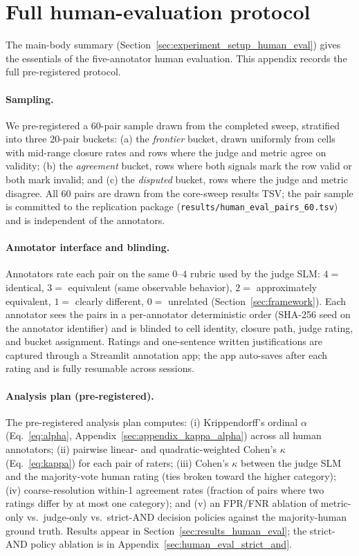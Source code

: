 \section{Full human-evaluation protocol}
\label{sec:appendix_human_eval_protocol}

The main-body summary (Section~\ref{sec:experiment_setup_human_eval})
gives the essentials of the five-annotator human evaluation. This
appendix records the full pre-registered protocol.

\paragraph{Sampling.} We pre-registered a 60-pair sample drawn from the
completed sweep, stratified into three 20-pair buckets:
(a) the \emph{frontier} bucket, drawn uniformly from cells with
mid-range closure rates and rows where the judge and metric agree on
validity;
(b) the \emph{agreement} bucket, rows where both signals mark the row
valid or both mark invalid; and
(c) the \emph{disputed} bucket, rows where the judge and metric
disagree.
All 60 pairs are drawn from the core-sweep results TSV; the pair
sample is committed to the replication package
(\texttt{results/human\_eval\_pairs\_60.tsv}) and is independent of
the annotators.

\paragraph{Annotator interface and blinding.} Annotators rate each
pair on the same $0$--$4$ rubric used by the judge SLM:
$4 = $ identical, $3 = $ equivalent (same observable behavior),
$2 = $ approximately equivalent, $1 = $ clearly different,
$0 = $ unrelated (Section~\ref{sec:framework}). Each annotator sees
the pairs in a per-annotator deterministic order (SHA-256 seed on the
annotator identifier) and is blinded to cell identity, closure path,
judge rating, and bucket assignment. Ratings and one-sentence written
justifications are captured through a Streamlit annotation app; the
app auto-saves after each rating and is fully resumable across
sessions.

\paragraph{Analysis plan (pre-registered).} The pre-registered
analysis plan computes: (i) Krippendorff's ordinal $\alpha$
(Eq.~\ref{eq:alpha}, Appendix~\ref{sec:appendix_kappa_alpha}) across
all human annotators; (ii) pairwise linear- and quadratic-weighted
Cohen's $\kappa$ (Eq.~\ref{eq:kappa}) for each pair of raters;
(iii) Cohen's $\kappa$ between the judge SLM and the majority-vote
human rating (ties broken toward the higher category); (iv)
coarse-resolution within-1 agreement rates (fraction of pairs where
two ratings differ by at most one category); and (v) an FPR/FNR
ablation of metric-only vs.\ judge-only vs.\ strict-AND decision
policies against the majority-human ground truth. Results appear in
Section~\ref{sec:results_human_eval}; the strict-AND policy ablation
is in Appendix~\ref{sec:human_eval_strict_and}.
